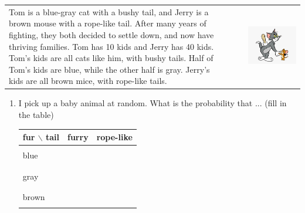 \documentclass{article}
\newcommand{\blue}[1]{{\color{blue}#1}}
\newcommand{\gray}[1]{\textcolor{lightgray}{#1}}
\begin{document}
\begin{enumerate}
\begin{tabular}[t]{lll}
\begin{minipage}{.75\linewidth}
Tom is a blue-gray cat with a bushy tail, and Jerry is a brown mouse with a rope-like tail. After many years of fighting, they both decided to settle down, and now have thriving families. Tom has 10 kids and Jerry has 40 kids. Tom's kids are all  cats like him, with bushy tails. Half of Tom's kids are blue, while the other half is gray. Jerry's kids are all brown mice, with rope-like tails.
\end{minipage}
&$\quad$&
\begin{minipage}{.2\linewidth}
\includegraphics[width=\linewidth]{figs/tomjerry.jpg}

\end{minipage}
\end{tabular}


\begin{enumerate}
\item 
I pick up a baby animal at random.  What is the probability that ... (fill in the table)
\begin{center}
\begin{tabular}{|l|ll|}
\hline
fur $\backslash$ tail & furry & rope-like\\\hline
&&\\blue&&\\&&\\
&&\\gray&&\\&&\\
&&\\brown&&\\&&\\
\hline
\end{tabular}
\end{center}




\end{enumerate}
\end{enumerate}
\end{document}
